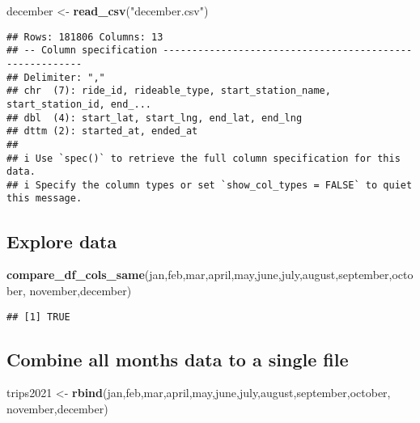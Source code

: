 \documentclass[
]{article}
\newenvironment{Shaded}{\begin{snugshade}}{\end{snugshade}}
\newcommand{\FunctionTok}[1]{\textcolor[rgb]{0.13,0.29,0.53}{\textbf{#1}}}
\newcommand{\NormalTok}[1]{#1}
\newcommand{\OtherTok}[1]{\textcolor[rgb]{0.56,0.35,0.01}{#1}}
\newcommand{\StringTok}[1]{\textcolor[rgb]{0.31,0.60,0.02}{#1}}
\begin{document}
\begin{Shaded}
\begin{Highlighting}[]
\NormalTok{december }\OtherTok{\textless{}{-}} \FunctionTok{read\_csv}\NormalTok{(}\StringTok{"december.csv"}\NormalTok{)}
\end{Highlighting}
\end{Shaded}

\begin{verbatim}
## Rows: 181806 Columns: 13
## -- Column specification --------------------------------------------------------
## Delimiter: ","
## chr  (7): ride_id, rideable_type, start_station_name, start_station_id, end_...
## dbl  (4): start_lat, start_lng, end_lat, end_lng
## dttm (2): started_at, ended_at
## 
## i Use `spec()` to retrieve the full column specification for this data.
## i Specify the column types or set `show_col_types = FALSE` to quiet this message.
\end{verbatim}

\hypertarget{explore-data}{%
\subsection{Explore data}\label{explore-data}}

\begin{Shaded}
\begin{Highlighting}[]
\FunctionTok{compare\_df\_cols\_same}\NormalTok{(jan,feb,mar,april,may,june,july,august,september,october,}
\NormalTok{                     november,december)}
\end{Highlighting}
\end{Shaded}

\begin{verbatim}
## [1] TRUE
\end{verbatim}

\hypertarget{combine-all-months-data-to-a-single-file}{%
\subsection{Combine all months data to a single
file}\label{combine-all-months-data-to-a-single-file}}

\begin{Shaded}
\begin{Highlighting}[]
\NormalTok{trips2021 }\OtherTok{\textless{}{-}} \FunctionTok{rbind}\NormalTok{(jan,feb,mar,april,may,june,july,august,september,october,}
\NormalTok{                   november,december)}
\end{Highlighting}
\end{Shaded}
\end{document}
